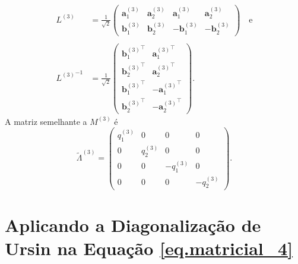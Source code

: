 \begin{align*}
L^{(3)}&=\frac{1}{\sqrt{2}}
\begin{pmatrix}
\mathbf{a}^{(3)}_1&\mathbf{a}^{(3)}_2&\mathbf{a}^{(3)}_1&\mathbf{a}^{(3)}_2\\
\mathbf{b}^{(3)}_1&\mathbf{b}^{(3)}_2&-\mathbf{b}^{(3)}_1&-\mathbf{b}^{(3)}_2
\end{pmatrix}
\quad\text{e}
\\\\
{L^{(3)}}^{-1}&=\frac{1}{\sqrt{2}}
\begin{pmatrix}
{\mathbf{b}^{(3)}_1}^{\top}&{\mathbf{a}^{(3)}_1}^{\top}\\
{\mathbf{b}^{(3)}_2}^{\top}&{\mathbf{a}^{(3)}_2}^{\top}\\
{\mathbf{b}^{(3)}_1}^{\top}&-{\mathbf{a}^{(3)}_1}^{\top}\\
{\mathbf{b}^{(3)}_2}^{\top}&-{\mathbf{a}^{(3)}_2}^{\top}
\end{pmatrix}.
\end{align*}
A matriz semelhante a $M^{(3)}$ \'e
\begin{equation*}
\tilde{\Lambda}^{(3)}=
\begin{pmatrix}
q^{(3)}_1&0&0&0\\
0&q^{(3)}_2&0&0\\
0&0&-q^{(3)}_1&0\\
0&0&0&-q^{(3)}_2
\end{pmatrix}.
\end{equation*}


\section{Aplicando a Diagonaliza\c{c}\~ao de Ursin na Equa\c{c}\~ao \ref{eq.matricial_4}}\label{sec.diagonalizacao_4}

